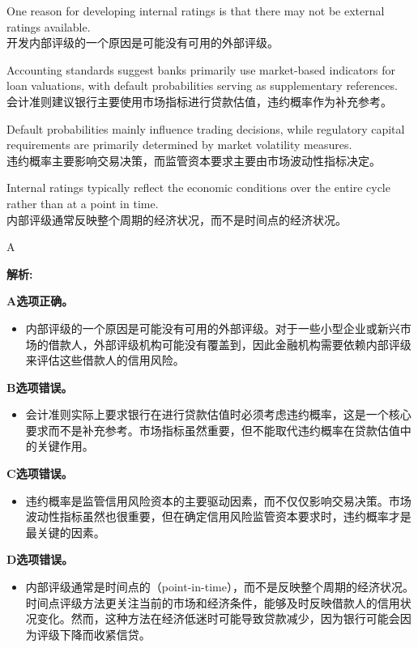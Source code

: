 \documentclass{article}
\newenvironment{explanation}
{\textbf{解析:}\par}
{\par}
\begin{document}
\begin{choices}
    \item One reason for developing internal ratings is that there may not be external ratings available.\\
    开发内部评级的一个原因是可能没有可用的外部评级。
    \item Accounting standards suggest banks primarily use market-based indicators for loan valuations, with default probabilities serving as supplementary references.\\
    会计准则建议银行主要使用市场指标进行贷款估值，违约概率作为补充参考。
    \item Default probabilities mainly influence trading decisions, while regulatory capital requirements are primarily determined by market volatility measures.\\
    违约概率主要影响交易决策，而监管资本要求主要由市场波动性指标决定。
    \item Internal ratings typically reflect the economic conditions over the entire cycle rather than at a point in time.\\
    内部评级通常反映整个周期的经济状况，而不是时间点的经济状况。
\end{choices}

\begin{correctanswer}
    A
\end{correctanswer}

\begin{explanation}
    \textbf{A选项正确。}
    \begin{itemize}
        \item 内部评级的一个原因是可能没有可用的外部评级。对于一些小型企业或新兴市场的借款人，外部评级机构可能没有覆盖到，因此金融机构需要依赖内部评级来评估这些借款人的信用风险。
    \end{itemize}

    \textbf{B选项错误。}
    \begin{itemize}
        \item 会计准则实际上要求银行在进行贷款估值时必须考虑违约概率，这是一个核心要求而不是补充参考。市场指标虽然重要，但不能取代违约概率在贷款估值中的关键作用。
    \end{itemize}

    \textbf{C选项错误。}
    \begin{itemize}
        \item 违约概率是监管信用风险资本的主要驱动因素，而不仅仅影响交易决策。市场波动性指标虽然也很重要，但在确定信用风险监管资本要求时，违约概率才是最关键的因素。
    \end{itemize}

    \textbf{D选项错误。}
    \begin{itemize}
        \item 内部评级通常是时间点的（point-in-time），而不是反映整个周期的经济状况。时间点评级方法更关注当前的市场和经济条件，能够及时反映借款人的信用状况变化。然而，这种方法在经济低迷时可能导致贷款减少，因为银行可能会因为评级下降而收紧信贷。
    \end{itemize}
\end{explanation}
\end{document}
